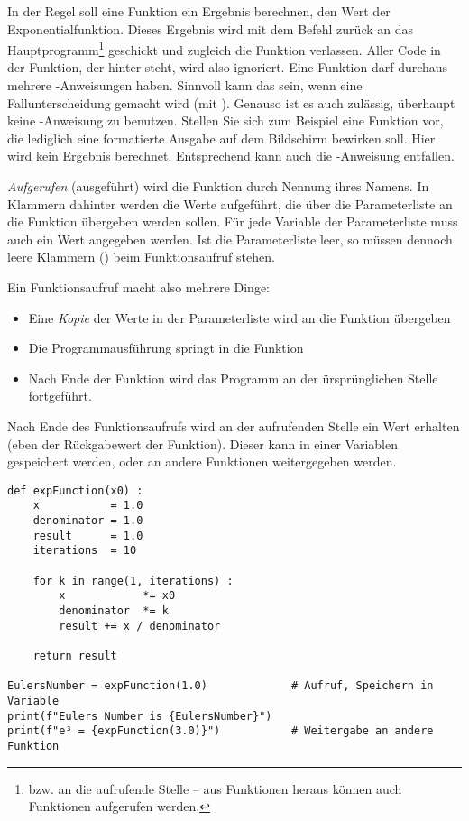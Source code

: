 In der Regel soll eine Funktion ein Ergebnis berechnen, \eg den Wert der Exponentialfunktion. Dieses Ergebnis wird mit dem Befehl  zurück an das Hauptprogramm\footnote{bzw. an die aufrufende Stelle -- aus Funktionen heraus können auch Funktionen aufgerufen werden.} geschickt und zugleich die Funktion verlassen. Aller Code in der Funktion, der hinter  steht, wird also ignoriert. Eine Funktion darf durchaus mehrere -Anweisungen haben. Sinnvoll kann das sein, wenn eine Fallunterscheidung gemacht wird (\eg mit ). Genauso ist es auch zulässig, überhaupt keine -Anweisung zu benutzen. Stellen Sie sich zum Beispiel eine Funktion vor, die lediglich eine formatierte Ausgabe auf dem Bildschirm bewirken soll. Hier wird kein Ergebnis berechnet. Entsprechend kann auch die -Anweisung entfallen.

\emph{Aufgerufen} (\ie ausgeführt) wird die Funktion durch Nennung ihres Namens. In Klammern dahinter werden die Werte aufgeführt, die über die Parameterliste an die Funktion übergeben werden sollen. Für jede Variable der Parameterliste muss auch ein Wert angegeben werden. Ist die Parameterliste leer, so müssen dennoch leere Klammern () beim Funktionsaufruf stehen.

Ein Funktionsaufruf macht also mehrere Dinge:
\begin{itemize}
\item Eine \emph{Kopie} der Werte in der Parameterliste wird an die Funktion übergeben
\item Die Programmausführung springt in die Funktion
\item Nach Ende der Funktion wird das Programm an der ürsprünglichen Stelle fortgeführt.
\end{itemize}
Nach Ende des Funktionsaufrufs wird an der aufrufenden Stelle ein Wert erhalten (eben der Rückgabewert der Funktion). Dieser kann in einer Variablen gespeichert werden, oder an andere Funktionen weitergegeben werden.

\begin{codebox}
\begin{verbatim}
def expFunction(x0) :
    x           = 1.0
    denominator = 1.0
    result      = 1.0
    iterations  = 10
  
    for k in range(1, iterations) :
        x            *= x0
        denominator  *= k
        result += x / denominator
    
    return result

EulersNumber = expFunction(1.0)             # Aufruf, Speichern in Variable
print(f"Eulers Number is {EulersNumber}")
print(f"e³ = {expFunction(3.0)}")           # Weitergabe an andere Funktion
\end{verbatim}
\end{codebox}

